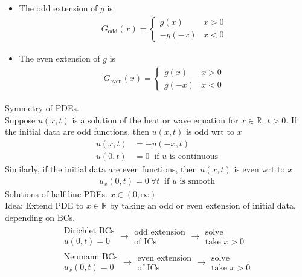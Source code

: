 \documentclass[12pt, letterpaper]{article}
\begin{document}
\begin{itemize}
    \item The odd extension of $g$ is 
    \begin{align*}
        G_{\text{odd}}(x) = \begin{cases}
            g(x) & x > 0 \\
            -g(-x) & x < 0
        \end{cases}
    \end{align*}
    \item The even extension of $g$ is 
    \begin{align*}
        G_{\text{even}}(x) =\begin{cases}
            g(x) & x > 0 \\
            g(-x) & x < 0
        \end{cases}
    \end{align*}
\end{itemize}
\underline{Symmetry of PDEs}. \\
Suppose $u(x,t)$ is a solution of the heat or wave equation for $x \in \mathbb{R},\ t > 0$. 
If the initial data are odd functions, then $u(x,t)$ is odd wrt to $x$
\begin{align*}
    u(x,t) &= -u(-x,t) \\
    u(0,t) &= 0\ \text{ if } u \text{ is continuous}
\end{align*}
Similarly, if the initial data are even functions, then $u(x,t)$ is even wrt to $x$
\begin{align*}
    u_x(0,t) = 0 \ \forall t\ \text{ if } u \text{ is smooth}
\end{align*}
\underline{Solutions of half-line PDEs}. $x \in (0,\infty)$. \\
Idea: Extend PDE to $x \in \mathbb{R}$ by taking an odd or even extension of initial data, 
depending on BCs.
\begin{align*}
    \begin{matrix}
        \text{Dirichlet BCs} \\ u(0,t) = 0
    \end{matrix} 
    \rightarrow 
    \begin{matrix}
        \text{odd extension} \\ \text{of ICs}
    \end{matrix}
    \rightarrow
    \begin{matrix}
        \text{solve} \\ \text{take } x > 0
    \end{matrix} \\
    \begin{matrix}
        \text{Neumann BCs} \\ u_x(0,t) = 0
    \end{matrix} 
    \rightarrow 
    \begin{matrix}
        \text{even extension} \\ \text{of ICs}
    \end{matrix}
    \rightarrow
    \begin{matrix}
        \text{solve} \\ \text{take } x > 0
    \end{matrix}
\end{align*}
\end{document}
